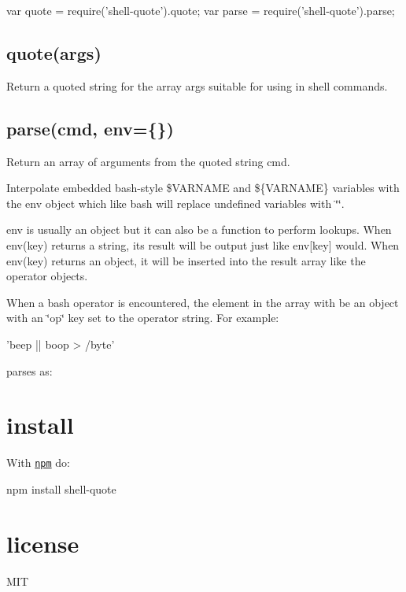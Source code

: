 \begin{DoxyCode}
var quote = require('shell-quote').quote;
var parse = require('shell-quote').parse;
\end{DoxyCode}


\subsection*{quote(args)}

Return a quoted string for the array {\ttfamily args} suitable for using in shell commands.

\subsection*{parse(cmd, env=\{\})}

Return an array of arguments from the quoted string {\ttfamily cmd}.

Interpolate embedded bash-\/style {\ttfamily \$\+V\+A\+R\+N\+A\+ME} and {\ttfamily \$\{V\+A\+R\+N\+A\+ME\}} variables with the {\ttfamily env} object which like bash will replace undefined variables with {\ttfamily \char`\"{}\char`\"{}}.

{\ttfamily env} is usually an object but it can also be a function to perform lookups. When {\ttfamily env(key)} returns a string, its result will be output just like {\ttfamily env\mbox{[}key\mbox{]}} would. When {\ttfamily env(key)} returns an object, it will be inserted into the result array like the operator objects.

When a bash operator is encountered, the element in the array with be an object with an {\ttfamily \char`\"{}op\char`\"{}} key set to the operator string. For example\+:


\begin{DoxyCode}
'beep || boop > /byte'
\end{DoxyCode}


parses as\+:


\begin{DoxyCode}
\end{DoxyCode}


\section*{install}

With \href{http://npmjs.org}{\tt npm} do\+:


\begin{DoxyCode}
npm install shell-quote
\end{DoxyCode}


\section*{license}

M\+IT 